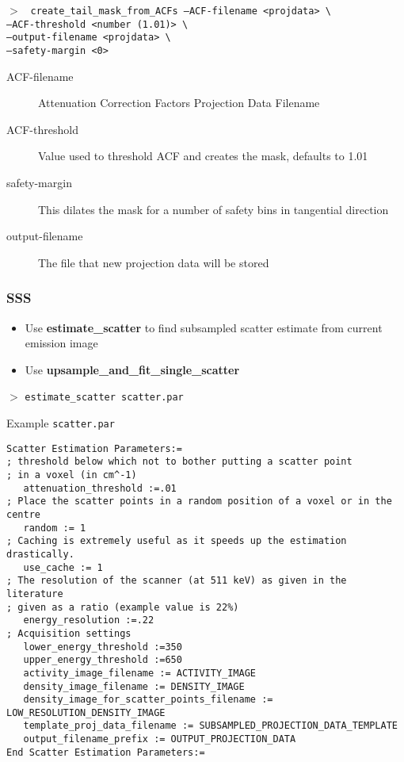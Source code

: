 \documentclass{article}
\newcommand{\cmdline}[1]{\par \noindent $>$ \texttt{#1}\par}
\begin{document}
\cmdline{%
create\_tail\_mask\_from\_ACFs		--ACF-filename <projdata> \textbackslash \\
					--ACF-threshold <number (1.01)> \textbackslash \\
					--output-filename <projdata> \textbackslash \\
					--safety-margin <0>%
}
\begin{description}
\item[ACF-filename] Attenuation Correction Factors Projection Data Filename
\item[ACF-threshold] Value used to threshold ACF and creates the mask, defaults to 1.01
\item[safety-margin] This dilates the mask for a number of safety bins in tangential direction
\item[output-filename] The file that new projection data will be stored
\end{description}

\subsubsection{SSS}
\begin{itemize} 
\item Use \textbf{estimate\_scatter} to find subsampled scatter estimate from current emission image
\item Use \textbf{upsample\_and\_fit\_single\_scatter}
\end{itemize} 


\cmdline{estimate\_scatter scatter.par}
Example \texttt{scatter.par}
\begin{verbatim}
Scatter Estimation Parameters:=
; threshold below which not to bother putting a scatter point
; in a voxel (in cm^-1)
   attenuation_threshold :=.01
; Place the scatter points in a random position of a voxel or in the centre
   random := 1
; Caching is extremely useful as it speeds up the estimation drastically.
   use_cache := 1
; The resolution of the scanner (at 511 keV) as given in the literature
; given as a ratio (example value is 22%)
   energy_resolution :=.22
; Acquisition settings
   lower_energy_threshold :=350
   upper_energy_threshold :=650
   activity_image_filename := ACTIVITY_IMAGE
   density_image_filename := DENSITY_IMAGE
   density_image_for_scatter_points_filename := LOW_RESOLUTION_DENSITY_IMAGE
   template_proj_data_filename := SUBSAMPLED_PROJECTION_DATA_TEMPLATE
   output_filename_prefix := OUTPUT_PROJECTION_DATA
End Scatter Estimation Parameters:=
\end{verbatim}
\end{document}
